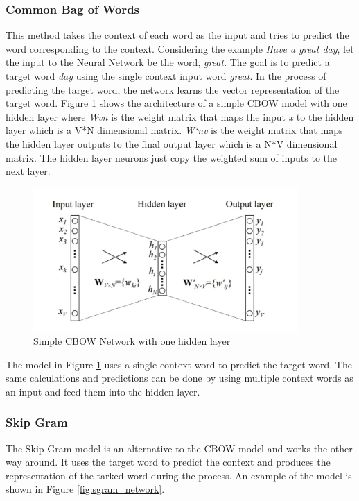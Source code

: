 \subsubsection{Common Bag of Words}
This method takes the context of each word as the input and tries to predict the word corresponding to the context. Considering the example \textit{Have a great day}, let the input to the Neural Network be the word, \textit{great}. The goal is to predict a target word \textit{day} using the single context input word \textit{great}. In the process of predicting the target word, the network learns the vector representation of the target word. Figure \ref{fig:cbow_network} shows the architecture of a simple CBOW model with one hidden layer where \textit{Wvn} is the weight matrix that maps the input \textit{x} to the hidden layer which is a V*N dimensional matrix. \textit{W`nv} is the weight matrix that maps the hidden layer outputs to the final output layer which is a N*V dimensional matrix. The hidden layer neurons just copy the weighted sum of inputs to the next layer.

\begin{figure}[H]
	\centering
	\includegraphics[width=0.9\textwidth]{figures/cbow_network.png}
	\caption{Simple CBOW Network with one hidden layer}
	\label{fig:cbow_network}
\end{figure}

The model in Figure \ref{fig:cbow_network} uses a single context word to predict the target word. The same calculations and predictions can be done by using multiple context words as an input and feed them into the hidden layer.

\subsubsection{Skip Gram}
The Skip Gram model is an alternative to the CBOW model and works the other way around. It uses the target word to predict the context and produces the representation of the tarked word during the process. An example of the model is shown in Figure \ref{fig:sgram_network}.

